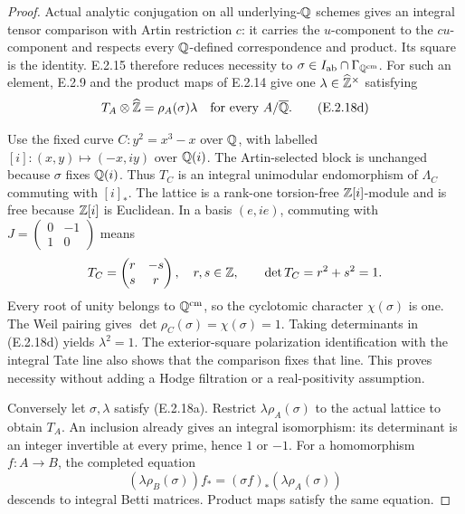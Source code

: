 \begin{proof}
Actual analytic conjugation on all underlying-\(\mathbb Q\) schemes
gives an integral tensor comparison with Artin restriction \(c\):
it carries the \(u\)-component to the \(cu\)-component and
respects every \(\mathbb Q\)-defined correspondence and product.
Its square is the identity. E.2.15 therefore reduces necessity
to \(\sigma\in I_{\mathrm{ab}}\cap\Gamma_{\mathbb Q^{\mathrm{cm}}}\).
For such an element, E.2.9 and the product maps of E.2.14 give
one \(\lambda\in\widehat{\mathbb Z}^\times\) satisfying
\[
 T_A\otimes\widehat{\mathbb Z}=\rho_A(\sigma)\lambda
 \quad\text{for every }A/\overline{\mathbb Q}.
 \tag{E.2.18d}
\]

Use the fixed curve \(C:y^2=x^3-x\) over \(\mathbb Q\), with labelled
\([i]:(x,y)\mapsto(-x,iy)\) over \(\mathbb Q(i)\).
The Artin-selected block is unchanged because \(\sigma\)
fixes \(\mathbb Q(i)\). Thus \(T_C\) is an integral unimodular
endomorphism of \(\Lambda_C\) commuting with \([i]_*\).
The lattice is a rank-one torsion-free \(\mathbb Z[i]\)-module and
is free because \(\mathbb Z[i]\) is Euclidean. In a basis \((e,ie)\),
commuting with \(J=\left(\begin{smallmatrix}0&-1\\1&0\end{smallmatrix}\right)\)
means
\[
 T_C=\begin{pmatrix}r&-s\\s&r\end{pmatrix},
 \quad r,s\in\mathbb Z,\qquad
 \det T_C=r^2+s^2=1.
\]
Every root of unity belongs to \(\mathbb Q^{\mathrm{cm}}\), so
the cyclotomic character \(\chi(\sigma)\) is one.
The Weil pairing gives
\(\det\rho_C(\sigma)=\chi(\sigma)=1\).
Taking determinants in (E.2.18d) yields \(\lambda^2=1\).
The exterior-square polarization identification with the
integral Tate line also shows that the comparison fixes
that line. This proves necessity without adding a Hodge
filtration or a real-positivity assumption.

Conversely let \(\sigma,\lambda\) satisfy (E.2.18a).
Restrict \(\lambda\rho_A(\sigma)\) to the actual lattice
to obtain \(T_A\). An inclusion already gives an integral
isomorphism: its determinant is an integer invertible at
every prime, hence \(1\) or \(-1\).
For a homomorphism \(f:A\to B\), the completed equation
\[
 (\lambda\rho_B(\sigma))f_*
       =(\sigma f)_*(\lambda\rho_A(\sigma))
\]
descends to integral Betti matrices. Product maps satisfy
the same equation.


\end{proof}
